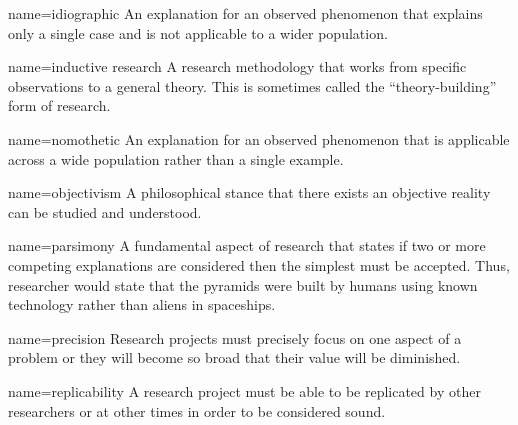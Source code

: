 {name={idiographic}}
{%
	An explanation for an observed phenomenon that explains only a single case and is not applicable to a wider population.
}

{name={inductive research}}
{%
	A research methodology that works from specific observations to a general theory. This is sometimes called the ``theory-building'' form of research.
}

{name={nomothetic}}
{%
	An explanation for an observed phenomenon that is applicable across a wide population rather than a single example.
}

{name={objectivism}}
{%
	A philosophical stance that there exists an objective reality can be studied and understood.
}



	{name={parsimony}}
	{%
		A fundamental aspect of research that states if two or more competing explanations are considered then the simplest must be accepted. Thus, researcher would state that the pyramids were built by humans using known technology rather than aliens in spaceships.
	}

	{name={precision}}
	{%
		Research projects must precisely focus on one aspect of a problem or they will become so broad that their value will be diminished.
	}

	{name={replicability}}
	{%
		A research project must be able to be replicated by other researchers or at other times in order to be considered sound.
	}
